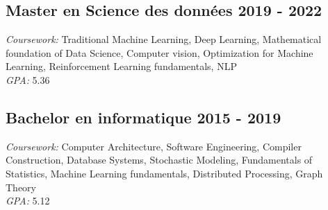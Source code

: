 \subsection{Master en Science des données \hfill 2019 - 2022\\}
\vspace{0.7\baselineskip}
\textit{Coursework:} Traditional Machine Learning, Deep Learning, Mathematical foundation of Data Science,
Computer vision, Optimization for Machine Learning, Reinforcement Learning fundamentals, NLP\\
\textit{GPA:} 5.36
\vspace{0.35\baselineskip}


\subsection{Bachelor en informatique \hfill 2015 - 2019\\}
\vspace{0.7\baselineskip}
\textit{Coursework:}  Computer Architecture, Software Engineering, Compiler Construction, Database Systems,
Stochastic Modeling, Fundamentals of Statistics, Machine Learning fundamentals, Distributed Processing, Graph Theory\\
\textit{GPA:} 5.12
\vspace{0.35\baselineskip}
